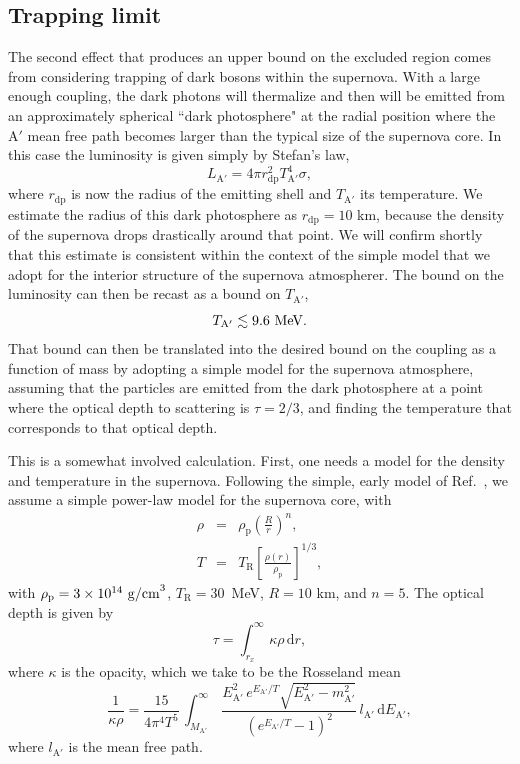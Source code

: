 \documentclass[nofootinbib,prd,superscriptaddress,twocolumn]{revtex4}
\newcommand{\beq}{\begin{equation}}
\newcommand{\eeq}{\end{equation}}
\newcommand{\bea}{\begin{eqnarray}}
\newcommand{\eea}{\end{eqnarray}}
\newcommand{\Aprime}{\mathrm{A}'}
\newcommand{\rdp}{r_{\mathrm{dp}}}
\newcommand{\dd}{\mathrm{d}}
\begin{document}
\subsection{Trapping limit}

The second effect that produces an upper bound on the excluded region 
comes from considering trapping of dark bosons within the supernova. 
With a large enough coupling, the dark photons will thermalize and then 
will be emitted from an approximately spherical ``dark photosphere" at the radial position 
where the $\Aprime$ mean free path becomes larger than the typical size of the supernova core. 
In this case the luminosity is given simply by Stefan's law, 
\beq
L_{\mathrm{A'}}  = 4\pi \rdp^2 T_{\mathrm{A'}}^4 \sigma,
\eeq
where $\rdp$ is now the radius of the emitting shell and $T_{\mathrm{A'}}$ its temperature. 
We estimate the radius of this dark photosphere as $\rdp=10$ km, 
because the density of the supernova drops drastically around that point. We will 
confirm shortly that this estimate is consistent within the context of the simple model that we 
adopt for the interior structure of the supernova atmospherer. The bound on the luminosity can then 
be recast as a bound on $T_{\mathrm{A}'}$, 
%
\beq
T_{\mathrm{A}'} \lesssim 9.6\rm\ MeV.
\eeq
%
That bound can then be translated into the desired bound on the coupling as a function of mass by adopting a 
simple model for the supernova atmosphere, assuming that the particles are emitted from the dark photosphere 
at a point where the optical depth to scattering is $\tau = 2/3 $, and finding the temperature that corresponds 
to that optical depth. 

This is a somewhat involved calculation. First, one needs a model for the density and temperature in the supernova. Following the simple, early model of Ref.~\cite{turner88}, we assume a simple power-law model for the supernova core, with 
\bea
\rho &=& \rho_{\mathrm{p}} \left( \frac{R}{r}\right )^n,\\
T &=& T_{\mathrm{R}} \left[ \frac{\rho(r)}{\rho_{\mathrm{p}}} \right]^{1/3},
\eea
with $  \rho_{\mathrm{p}}  = 3\times10^{14}\ {\rm g/cm}^3$, $T_{\mathrm{R}} = 30$~MeV, $R = 10$ km,
and $n = 5$.
The optical depth is given by 
\beq
\tau = \int_{r_x}^{\infty}\, \kappa \rho\,  \dd r,
\eeq
where $ \kappa$ is the opacity, which we take to be the Rosseland mean 
%
\beq 
\frac{1}{\kappa \rho} = \frac{15}{4 \pi^4 T^5}\, \int_{M_{\mathrm{A'}}}^{\infty}\, 
\frac{E_{\mathrm{A'}}^2\, e^{E_{\mathrm{A'}}/T} 
\sqrt{E_{\mathrm{A'}}^2 - m_{\mathrm{A'}}^2}}
{(e^{E_{\mathrm{A'}}/T}-1)^2}\, l_{\mathrm{A'}}\, \dd E_{\mathrm{A'}},
\eeq
where $l_{\mathrm{A'}}$ is the mean free path. 
\end{document}

